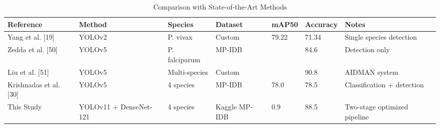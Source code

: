 \begin{table}[h]
\centering
\caption{Comparison with State-of-the-Art Methods}
\label{tab:prior_works_comparison}
\begin{tabular}{lllllll}
\toprule
Reference & Method & Species & Dataset & mAP50 & Accuracy & Notes \\
\midrule
Yang et al. [19] & YOLOv2 & P. vivax & Custom & 79.22 & 71.34 & Single species detection \\
Zedda et al. [50] & YOLOv5 & P. falciparum & MP-IDB &  & 84.6 & Detection only \\
Liu et al. [51] & YOLOv5 & Multi-species & Custom &  & 90.8 & AIDMAN system \\
Krishnadas et al. [30] & YOLOv5 & 4 species & MP-IDB & 78.0 & 78.5 & Classification + detection \\
This Study & YOLOv11 + DenseNet-121 & 4 species & Kaggle MP-IDB & 0.9 & 88.5 & Two-stage optimized pipeline \\
\bottomrule
\end{tabular}

\end{table}
